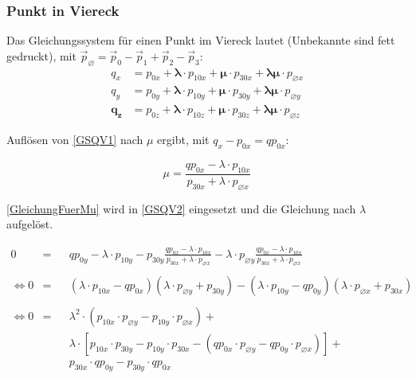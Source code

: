 \subsubsection{Punkt in Viereck}
Das Gleichungssystem für einen Punkt im Viereck lautet (Unbekannte sind fett gedruckt), mit $\vec{p}_{\varnothing} = \vec{p}_{0} - \vec{p}_{1} + \vec{p}_{2} - \vec{p}_{3}$:
\begin{align}
	\label{GSQV1} q_{x} &= p_{0x} + \bm{\lambda} \cdot p_{10x} + \bm{\mu} \cdot p_{30x} + \bm{\lambda}\bm{\mu} \cdot p_{\varnothing x} \\
	\label{GSQV2} q_{y} &= p_{0y} + \bm{\lambda} \cdot p_{10y} + \bm{\mu} \cdot p_{30y} + \bm{\lambda}\bm{\mu} \cdot p_{\varnothing y} \\
	\label{GSQV3} \bm{q_{z}} &= p_{0z} + \bm{\lambda} \cdot p_{10z} + \bm{\mu} \cdot p_{30z} + \bm{\lambda}\bm{\mu} \cdot p_{\varnothing z}
\end{align}

Auflösen von \cref{GSQV1} nach $\mu$ ergibt, mit $q_{x}-p_{0x}=qp_{0x}$:

\begin{equation}
	\label{GleichungFuerMu}
	\mu = \frac{qp_{0x}-\lambda \cdot p_{10x}}{p_{30x}+\lambda \cdot p_{\varnothing x}}
\end{equation}

\cref{GleichungFuerMu} wird in \cref{GSQV2} eingesetzt und die Gleichung nach $\lambda$ aufgelöst.

\begin{align}
	\nonumber 0 &=&&qp_{0y}-\lambda \cdot p_{10y}-p_{30y}\frac{qp_{0x}-\lambda \cdot p_{10x}}{p_{30x}+\lambda \cdot p_{\varnothing x}} - \lambda \cdot p_{\varnothing y} \frac{qp_{0x}-\lambda \cdot p_{10x}}{p_{30x}+\lambda \cdot p_{\varnothing x}} \\
	\nonumber \\
	\nonumber \iff 0 &=&&(\lambda \cdot p_{10x}-qp_{0x})(\lambda \cdot p_{\varnothing y}+p_{30y})-(\lambda \cdot p_{10y}-qp_{0y})(\lambda \cdot p_{\varnothing x}+p_{30x}) \\
	\nonumber \\
	\nonumber \iff 0 &=&&\lambda ^{2} \cdot (p_{10x} \cdot p_{\varnothing y} - p_{10y} \cdot p_{\varnothing x})+\\
	\nonumber & &&\lambda \cdot [p_{10x}\cdot p_{30y}-p_{10y}\cdot p_{30x}-(qp_{0x}\cdot p_{\varnothing y}-qp_{0y}\cdot p_{\varnothing x})]+\\
	\nonumber & &&p_{30x}\cdot qp_{0y}- p_{30y}\cdot qp_{0x}
\end{align}

